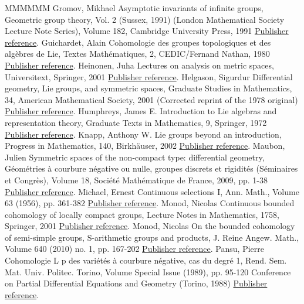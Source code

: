 \begin{thebibliography}{MMMMMM}
 Gromov, Mikhael Asymptotic invariants of infinite groups, Geometric group theory, Vol. 2 (Sussex, 1991) (London Mathematical Society Lecture Note Series), Volume 182, Cambridge University Press, 1991 \href{https://ahl.centre-mersenne.org/item/AHL_2020__3__1291_0/#G}{Publisher reference}.
 Guichardet, Alain Cohomologie des groupes topologiques et des algèbres de Lie, Textes Mathématiques, 2, CEDIC/Fernand Nathan, 1980 \href{https://ahl.centre-mersenne.org/item/AHL_2020__3__1291_0/#Gui}{Publisher reference}.
 Heinonen, Juha Lectures on analysis on metric spaces, Universitext, Springer, 2001 \href{https://ahl.centre-mersenne.org/item/AHL_2020__3__1291_0/#Hei}{Publisher reference}.
 Helgason, Sigurdur Differential geometry, Lie groups, and symmetric spaces, Graduate Studies in Mathematics, 34, American Mathematical Society, 2001 (Corrected reprint of the 1978 original) \href{https://ahl.centre-mersenne.org/item/AHL_2020__3__1291_0/#Helgason}{Publisher reference}.
 Humphreys, James E. Introduction to Lie algebras and representation theory, Graduate Texts in Mathematics, 9, Springer, 1972 \href{https://ahl.centre-mersenne.org/item/AHL_2020__3__1291_0/#Humphreys-LA}{Publisher reference}.
 Knapp, Anthony W. Lie groups beyond an introduction, Progress in Mathematics, 140, Birkhäuser, 2002 \href{https://ahl.centre-mersenne.org/item/AHL_2020__3__1291_0/#Knapp}{Publisher reference}.
 Maubon, Julien Symmetric spaces of the non-compact type: differential geometry, Géométries à courbure négative ou nulle, groupes discrets et rigidités (Séminaires et Congrès), Volume 18, Société Mathématique de France, 2009, pp. 1-38 \href{https://ahl.centre-mersenne.org/item/AHL_2020__3__1291_0/#Maubon}{Publisher reference}.
 Michael, Ernest Continuous selections I, Ann. Math., Volume 63 (1956), pp. 361-382 \href{https://ahl.centre-mersenne.org/item/AHL_2020__3__1291_0/#Mi}{Publisher reference}.
 Monod, Nicolas Continuous bounded cohomology of locally compact groups, Lecture Notes in Mathematics, 1758, Springer, 2001 \href{https://ahl.centre-mersenne.org/item/AHL_2020__3__1291_0/#Monod_LNM}{Publisher reference}.
 Monod, Nicolas On the bounded cohomology of semi-simple groups, S-arithmetic groups and products, J. Reine Angew. Math., Volume 640 (2010) no. 1, pp. 167-202 \href{https://ahl.centre-mersenne.org/item/AHL_2020__3__1291_0/#Monod}{Publisher reference}.
 Pansu, Pierre Cohomologie L p  des variétés à courbure négative, cas du degré 1, Rend. Sem. Mat. Univ. Politec. Torino, Volume Special Issue (1989), pp. 95-120 Conference on Partial Differential Equations and Geometry (Torino, 1988) \href{https://ahl.centre-mersenne.org/item/AHL_2020__3__1291_0/#Pa1}{Publisher reference}.

\end{thebibliography}
